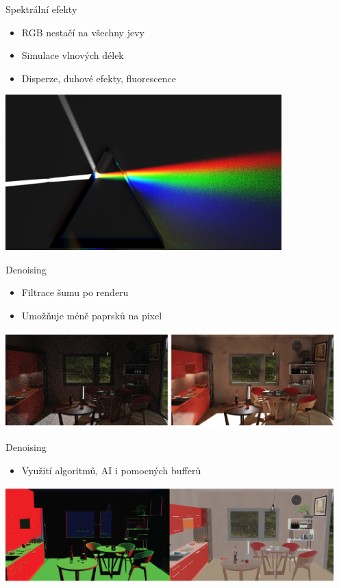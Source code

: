 \documentclass[czech]{beamer}
\begin{document}
\begin{frame}{Spektrální efekty}
\begin{itemize}
  \item RGB nestačí na všechny jevy
  \item Simulace vlnových délek
  \item Disperze, duhové efekty, fluorescence
\end{itemize}
\centering \includegraphics[width=0.8\textwidth]{img/spectrum.png}
\end{frame}


\begin{frame}{Denoising}
\begin{itemize}
  \item Filtrace šumu po renderu
  \item Umožňuje méně paprsků na pixel
\end{itemize}
\vfill
\centering \includegraphics[width=0.95\textwidth]{img/denoise example.png}
\end{frame}


\begin{frame}{Denoising}
\begin{itemize}
  \item Využití algoritmů, AI i pomocných bufferů
\end{itemize}
\vfill
\centering \includegraphics[width=0.95\textwidth]{img/denoise buffers.png}
\end{frame}
\end{document}
